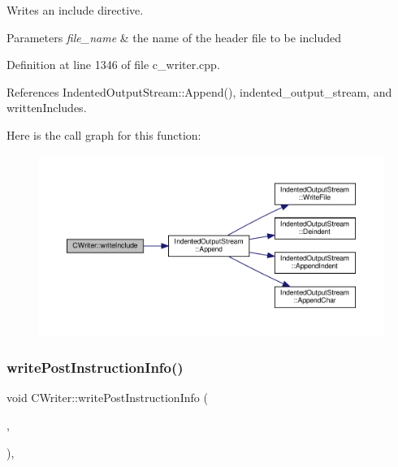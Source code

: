 Writes an include directive. 


\begin{DoxyParams}{Parameters}
{\em file\+\_\+name} & the name of the header file to be included \\
\hline
\end{DoxyParams}


Definition at line 1346 of file c\+\_\+writer.\+cpp.



References Indented\+Output\+Stream\+::\+Append(), indented\+\_\+output\+\_\+stream, and written\+Includes.

Here is the call graph for this function\+:
\nopagebreak
\begin{figure}[H]
\begin{center}
\leavevmode
\includegraphics[width=350pt]{d3/d59/classCWriter_a736e4e43725523bf3775ed54a9044997_cgraph}
\end{center}
\end{figure}
\mbox{\label{classCWriter_ad32d1e42246eafd2825029065ccd6280}} 
\subsubsection{\texorpdfstring{write\+Post\+Instruction\+Info()}{writePostInstructionInfo()}}
{\footnotesize\ttfamily void C\+Writer\+::write\+Post\+Instruction\+Info (\begin{DoxyParamCaption}\item[{const \hyperlink{function__behavior_8hpp_a94872da12ed056b6ecf90456164e0213}{Function\+Behavior\+Const\+Ref}}]{,  }\item[{const \hyperlink{graph_8hpp_abefdcf0544e601805af44eca032cca14}{vertex}}]{ }\end{DoxyParamCaption})\hspace{0.3cm}{\ttfamily [protected]}, {\ttfamily [virtual]}}



